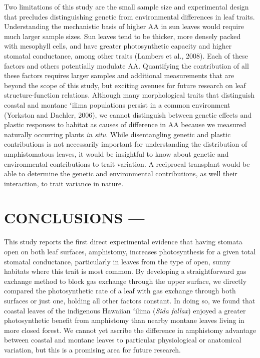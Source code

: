 \documentclass[
  letterpaper,
  DIV=11,
  numbers=noendperiod]{scrartcl}
\begin{document}
Two limitations of this study are the small sample size and experimental
design that precludes distinguishing genetic from environmental
differences in leaf traits. Understanding the mechanistic basis of
higher \(\mathrm{AA}\) in sun leaves would require much larger sample
sizes. Sun leaves tend to be thicker, more densely packed with mesophyll
cells, and have greater photosynthetic capacity and higher stomatal
conductance, among other traits (Lambers et al., 2008). Each of these
factors and others potentially modulate \(\mathrm{AA}\). Quantifying the
contribution of all these factors requires larger samples and additional
measurements that are beyond the scope of this study, but exciting
avenues for future research on leaf structure-function relations.
Although many morphological traits that distinguish coastal and montane
ʻilima populations persist in a common environment (Yorkston and
Daehler, 2006), we cannot distinguish between genetic effects and
plastic responses to habitat as causes of difference in \(\mathrm{AA}\)
because we measured naturally occurring plants \emph{in situ}. While
disentangling genetic and plastic contributions is not necessarily
important for understanding the distribution of amphistomatous leaves,
it would be insightful to know about genetic and environmental
contributions to trait variation. A reciprocal transplant would be able
to determine the genetic and environmental contributions, as well their
interaction, to trait variance in nature.

\hypertarget{conclusions}{%
\section{CONCLUSIONS ---}\label{conclusions}}

This study reports the first direct experimental evidence that having
stomata open on both leaf surfaces, amphistomy, increases photosynthesis
for a given total stomatal conductance, particularly in leaves from the
type of open, sunny habitats where this trait is most common. By
developing a straightforward gas exchange method to block gas exchange
through the upper surface, we directly compared the photosynthetic rate
of a leaf with gas exchange through both surfaces or just one, holding
all other factors constant. In doing so, we found that coastal leaves of
the indigenous Hawaiian ʻilima (\emph{Sida fallax}) enjoyed a greater
photosynthetic benefit from amphistomy than nearby montane leaves living
in more closed forest. We cannot yet ascribe the difference in
amphistomy advantage between coastal and montane leaves to particular
physiological or anatomical variation, but this is a promising area for
future research.
\end{document}
